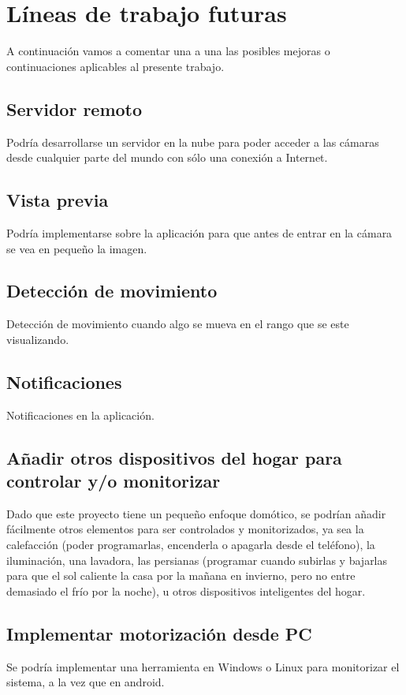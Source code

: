 \section{Líneas de trabajo futuras}

A continuación vamos a comentar una a una las posibles mejoras o continuaciones aplicables al presente trabajo.

\subsection{Servidor remoto}

Podría desarrollarse un servidor en la nube para poder acceder a las cámaras desde cualquier parte del mundo con sólo una conexión a Internet.

\subsection{Vista previa}

Podría implementarse sobre la aplicación para que antes de entrar en la cámara se vea en pequeño la imagen.

\subsection{Detección de movimiento}

Detección de movimiento cuando algo se mueva en el rango que se este visualizando.

\subsection{Notificaciones}

Notificaciones en la aplicación.

\subsection{Añadir otros dispositivos del hogar para controlar y/o monitorizar}

Dado que este proyecto tiene un pequeño enfoque domótico, se podrían añadir fácilmente otros elementos para ser controlados y monitorizados, ya sea la calefacción (poder programarlas, encenderla o apagarla desde el teléfono), la iluminación, una lavadora, las persianas (programar cuando subirlas y bajarlas para que el sol caliente la casa por la mañana en invierno, pero no entre demasiado el frío por la noche), u otros dispositivos inteligentes del hogar.

\subsection{Implementar motorización desde PC}

Se podría implementar una herramienta en Windows o Linux para monitorizar el sistema, a la vez que en android.









